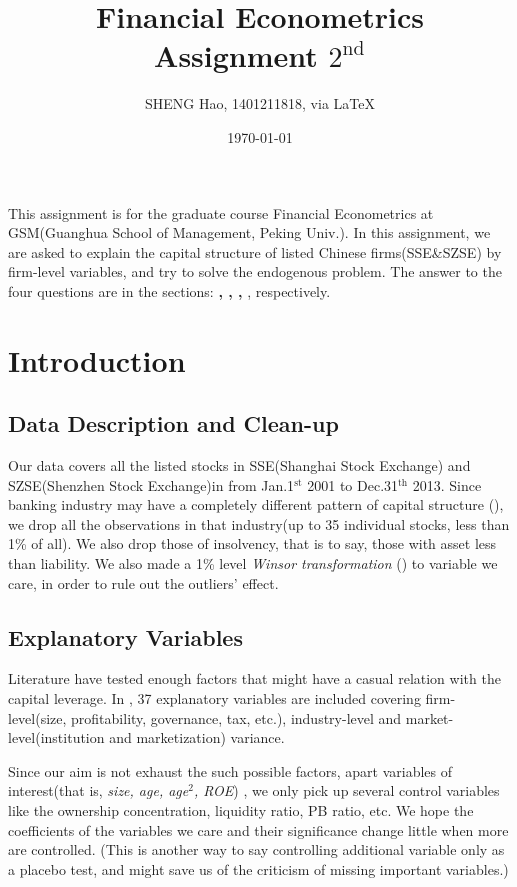 \documentclass{article}
\begin{document}
\title{Financial Econometrics\\Assignment $2^{\text{nd}}$}
\author{{\normalsize SHENG Hao, 1401211818, via \LaTeX}}
\date{\today}

\maketitle

\def \Pr{{\rm Pr}}
\baselineskip 0.6cm

 This assignment is for the graduate course Financial Econometrics at GSM(Guanghua School of Management, Peking Univ.). In this assignment, we are asked to explain the capital structure of listed Chinese firms(SSE\&SZSE) by firm-level variables, and try to solve the endogenous problem. The answer to the four questions are in the sections: {\bf {}, , , }, respectively.


\section{Introduction}
\subsection{Data Description and Clean-up}
Our data covers all the listed stocks in SSE(Shanghai Stock Exchange) and SZSE(Shenzhen Stock Exchange)in from Jan.1$^{\text{st}}$ 2001 to Dec.31$^{\text{th}}$ 2013. Since banking industry may have a completely different pattern of capital structure (\cite{DeAngelo2014}), we drop all the observations in that industry(up to 35 individual stocks, less than 1\% of all). We also drop those of insolvency, that is to say, those with asset less than liability. We also made a 1\% level {\it Winsor transformation} (\cite{Barnett1994}) to variable we care, in order to rule out the outliers' effect.

\subsection{Explanatory Variables}
Literature have tested enough factors that might have a casual relation with the capital leverage. In \cite{Frank2004}, 37 explanatory variables are included covering firm-level(size, profitability, governance, tax, etc.), industry-level and market-level(institution and marketization) variance.

Since our aim is not exhaust the such possible factors, apart variables of interest(that is, {\it size, age, age$^2$, ROE}) , we only pick up several control variables like the ownership concentration, liquidity ratio, PB ratio, etc. We hope the coefficients of the variables we care and their significance change little when more are controlled. (This is another way to say controlling additional variable only  as a placebo test, and might save us of the criticism of missing important variables.)
\end{document}
